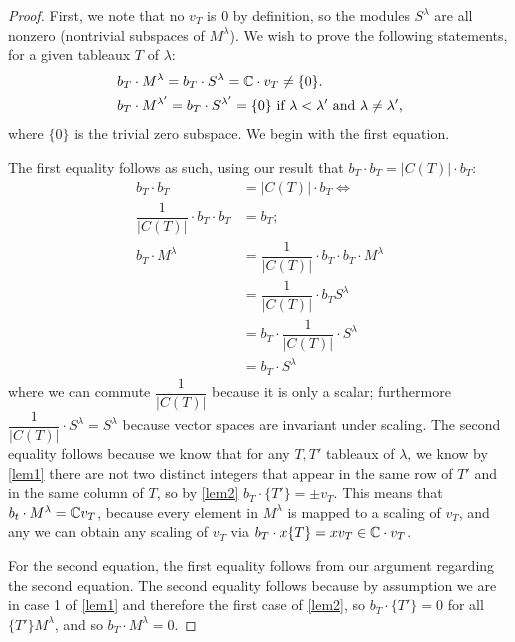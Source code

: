 \documentclass[12pt,twoside]{reedthesis}
\theoremstyle{plain}   %
\theoremstyle{definition}
\theoremstyle{remark}
\numberwithin{equation}{section}
\begin{document}
  \begin{proof}
    First, we note that no $v_T$ is $0$ by definition, so the modules $S^\lambda$ are all nonzero (nontrivial subspaces of $M^\lambda$).
    We wish to prove the following statements, for a given tableaux $T$ of $\lambda$:
    \begin{align}
      &b_T \cdot M^\lambda = b_T \cdot S^\lambda = \mathbb{C} \cdot v_T \neq \{0\}. \\
      &b_T \cdot M^{\lambda'} = b_T \cdot S^{\lambda'} = \{0\} \text{ if $\lambda < \lambda'$ and $\lambda \neq \lambda'$,}
    \end{align}
    where $\{0\}$ is the trivial zero subspace.
    We begin with the first equation. \par
    The first equality follows as such, using our result that $b_T \cdot b_T = |C(T)| \cdot b_T$:
    \begin{align*}
      b_T \cdot b_T &= |C(T)| \cdot b_T \iff \\
      \dfrac{1}{|C(T)|} \cdot b_T \cdot b_T &= b_T;\\
      b_T \cdot M^\lambda &= \dfrac{1}{|C(T)|} \cdot b_T \cdot b_T \cdot M^\lambda \\
                    &=\dfrac{1}{|C(T)|} \cdot b_T S^\lambda \\
                    &= b_T \cdot \dfrac{1}{|C(T)|}  \cdot S^\lambda \\
                    &= b_T \cdot S^\lambda
    \end{align*}
    where we can commute $\dfrac{1}{|C(T)|}$ because it is only a scalar; furthermore $\dfrac{1}{|C(T)|}  \cdot S^\lambda = S^\lambda$
    because vector spaces are invariant under scaling.
    The second equality follows because we know that for any $T,T'$ tableaux of $\lambda$, we know by \cref{lem1} there are not
    two distinct integers that appear in the same row of $T'$ and in the same column of $T$, so by \cref{lem2}
    $b_T \cdot \{T'\} = \pm v_T$.
    This means that $b_t \cdot M^\lambda = \mathbb{C} v_T$,
    because every element in $M^\lambda$ is mapped to a scaling of $v_T$, and any we can obtain any scaling of $v_T$ via
    $b_T \cdot x \{T\} =x v_T \in \mathbb{C} \cdot v_T$. \par
    For the second equation, the first equality follows from our argument regarding the second equation.
    The second equality follows because by assumption we are in case 1 of \cref{lem1} and therefore the first case of \cref{lem2},
    so $b_T \cdot \{T'\} = 0$ for all $\{T'\} M^\lambda$, and so $b_T \cdot M^\lambda = 0$.\par

\end{proof}
\end{document}
